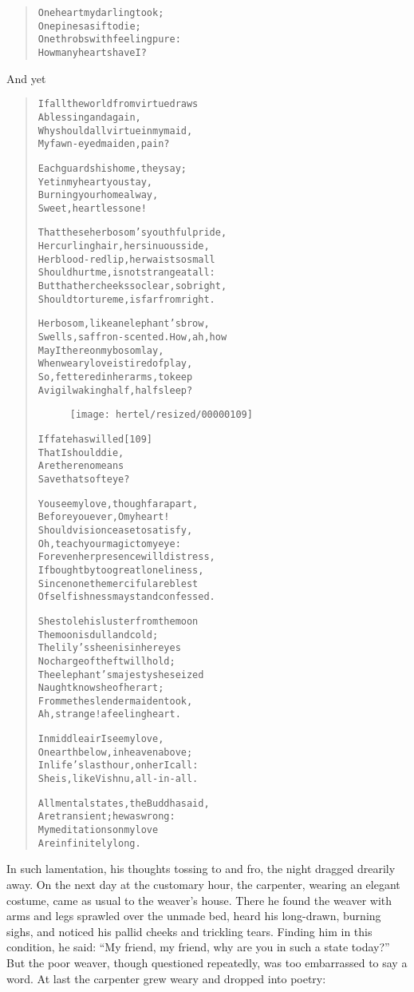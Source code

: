 \documentclass[article, twoside, 10pt]{memoir}
\renewenvironment{verbatim}{%
\begin{quote}%
\vskip -10pt%
\begin{alltt}\normalfont\small}{\end{alltt}%
\end{quote}%
\vskip -10pt
} %
\begin{document}
\begin{verbatim}
One heart my darling took;
    One pines as if to die;
One throbs with feeling pure:
    How many hearts have I?
\end{verbatim}
And yet

\begin{verbatim}
If all the world from virtue draws
    A blessing and a gain,
Why should all virtue in my maid,
    My fawn-eyed maiden, pain?

Each guards his home, they say;
Yet in my heart you stay,
Burning your home alway,
Sweet, heartless one!

That these{\textemdash}her bosom's youthful pride,
Her curling hair, her sinuous side,
Her blood-red lip, her waist so small{\textemdash}
Should hurt me, is not strange at all:
But that her cheeks so clear, so bright,
Should torture me, is far from right.

Her bosom, like an elephant's brow,
Swells, saffron-scented. How, ah, how
May I thereon my bosom lay,
When weary love is tired of play,
So, fettered in her arms, to keep
A vigil waking half, half sleep?

\begin{figure}[p]\texttt{[image: hertel/resized/00000109]}\end{figure}If fate has willed                                      [109]
    That I should die,
Are there no means
    Save that soft eye?

You see my love, though far apart,
Before you ever, O my heart!
Should vision cease to satisfy,
Oh, teach your magic to my eye:
For even her presence will distress,
If bought by too great loneliness,
Since none{\textemdash}the merciful are blest{\textemdash}
Of selfishness may stand confessed.

She stole his luster from the moon{\textemdash}
    The moon is dull and cold;
The lily's sheen is in her eyes{\textemdash}
    No charge of theft will hold;
The elephant's majesty she seized{\textemdash}
    Naught knows he of her art;
From me the slender maiden took,
    Ah, strange! a feeling heart.

In middle air I see my love,
On earth below, in heaven above;
In life's last hour, on her I call:
She is, like Vishnu, all-in-all.

All mental states, the Buddha said,
    Are transient; he was wrong:
My meditations on my love
    Are infinitely long.
\end{verbatim}
In such lamentation, his thoughts tossing to and fro, the night
dragged drearily away. On the next day at the customary hour, the
carpenter, wearing an elegant costume, came as usual to the
weaver's house. There he found the weaver with arms and legs
sprawled over the unmade bed, heard his long-drawn, burning sighs,
and noticed his pallid cheeks and trickling tears. Finding him in
this condition, he said:
``My friend, my friend, why are you in such a state today?'' But
the poor weaver, though questioned repeatedly, was too embarrassed
to say a word. At last the carpenter grew weary and dropped into
poetry:
\end{document}

